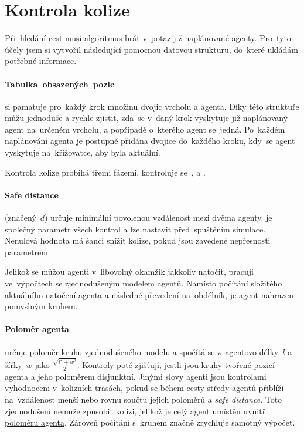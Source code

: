 \section{Kontrola kolize}\label{sec:kolize}


Při~hledání cest musí algoritmus brát v~potaz již naplánované agenty.
Pro~tyto účely jsem si vytvořil následující pomocnou datovou strukturu, do~které ukládám potřebné informace.

\paragraph{Tabulka~obsazených~pozic}\label{par:obsazene_pozice} si pamatuje pro~každý krok množinu dvojic vrcholu a agenta.
Díky této struktuře můžu jednoduše a rychle zjistit,
zda~se v~daný krok vyskytuje již naplánovaný agent na~určeném vrcholu, a popřípadě o~kterého agent se~jedná.
Po~každém naplánování agenta je postupně přidána dvojice do~každého kroku, kdy~se agent vyskytuje na~křižovatce,
aby byla  aktuální.

Kontrola kolize probíhá třemi fázemi, kontroluje se~,
 a .

\paragraph{Safe distance}\label{par:safe_distance} (značený~$d$) určuje minimální povolenou vzdálenost mezi dvěma agenty.
 je společný parametr všech kontrol a lze nastavit před~spuštěním simulace.
Nenulová hodnota  má šanci snížit kolize,
pokud jsou zavedené nepřesnosti parametrem .

Jelikož se můžou agenti v~libovolný okamžik jakkoliv natočit, pracuji ve~výpočtech se zjednodušeným modelem agentů.
Namísto počítání složitého aktuálního natočení agenta a následné převedení na~obdélník,
je agent nahrazen pomyslným kruhem.

\paragraph{Poloměr agenta}\label{par:polomer_agenta} určuje poloměr kruhu zjednodušeného modelu
a spočítá se z~agentovo délky~$l$ a šířky~$w$ jako $\frac{\sqrt {l^2 + w^2}}{2}$.
Kontroly poté zjišťují, jestli jsou kruhy tvořené pozicí agenta a jeho poloměrem disjunktní.
Jinými slovy agenti jsou kontrolami vyhodnoceni v~kolizních trasách,
pokud se během cesty středy agentů přiblíží na~vzdálenost menší nebo rovnu součtu jejich poloměrů a \emph{safe distance}.
Toto zjednodušení nemůže způsobit kolizi, jelikož je celý agent umístěn uvnitř \hyperref[par:polomer_agenta]{poloměru agenta}.
Zároveň počítání s~kruhem značně zrychluje samotný výpočet.

